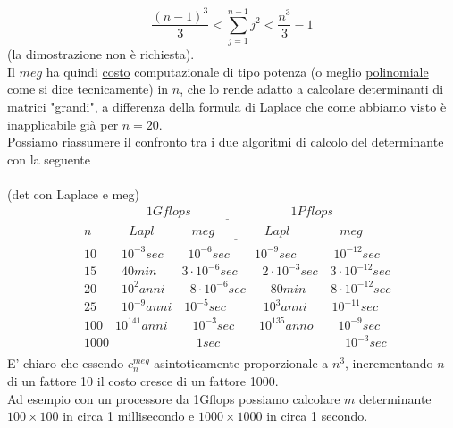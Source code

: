 \documentclass[12pt,a4paper]{article}
\begin{document}
\begin{equation*}
    \frac{(n-1)^3}{3}<\sum_{j=1}^{n-1}j^2<\frac{n^3}{3}-1
\end{equation*}
(la dimostrazione non è richiesta).\\Il $meg$ ha quindi \underline{costo} computazionale di tipo potenza (o meglio \underline{polinomiale} come si dice tecnicamente) in $n$, che lo rende adatto a calcolare determinanti di matrici "grandi", a differenza della formula di Laplace che come abbiamo visto è inapplicabile già per $n=20$.\\Possiamo riassumere il confronto tra i due algoritmi di calcolo del determinante con la seguente\\\\
 (det con Laplace e meg)
\[ \begin{split}
	& \underline{\quad\quad\quad\quad \quad1Gflops\quad\quad \quad\quad\quad\quad\quad\quad1Pflops \quad\quad\quad }\\
	& \underline{n\quad\quad\quad Lapl\quad\quad\quad meg\quad\quad\quad\quad Lapl\quad\quad\quad\quad meg\quad\quad}\\
	&  10\quad\quad 10^{-3}sec\quad\quad 10^{-6}sec\quad\quad 10^{-9}sec\quad\quad\quad 10^{-12}sec\\
	&  15\quad\quad 40min\quad\quad 3\cdot10^{-6}sec\quad\quad 2\cdot10^{-3}sec\quad 3\cdot10^{-12}sec\\
	& 20\quad\quad 10^{2}anni\quad\quad 8\cdot10^{-6}sec\quad\quad 80min\quad\quad 8\cdot10^{-12}sec\\
	& 25\quad\quad 10^{-9}anni\quad 10^{-5}sec\quad\quad\quad 10^3anni\quad\quad 10^{-11}sec\\
	& 100\quad 10^{141}anni\quad\quad 10^{-3}sec\quad\quad 10^{135}anno\quad\quad 10^{-9}sec\\ 
	& 1000\quad\quad \quad\quad\quad\quad\quad 1sec\quad\quad\quad \quad\quad\quad\quad\quad\quad\quad10^{-3}sec\\ 
\end{split} \]
E' chiaro che essendo $c_n^{meg}$ asintoticamente proporzionale a $n^3$, incrementando $n$ di un fattore 10 il costo cresce di un fattore 1000.\\Ad esempio con un processore da 1Gflops possiamo calcolare $m$ determinante $100\times 100$ in circa 1 millisecondo e $1000\times 1000$ in circa 1 secondo.
\end{document}
